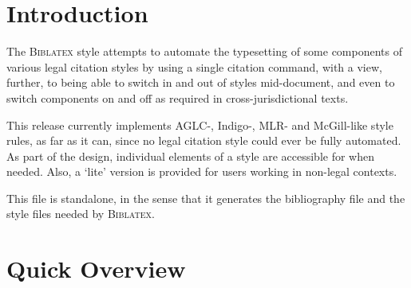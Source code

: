 \begin{center}
\end{center}

\section{Introduction}
\p The  \textsc{Biblatex} style attempts to automate the typesetting of some components of various legal citation styles by using a single citation command, with a view, further, to being able to switch in and out of styles mid-document, and even to switch components on and off as required in cross-jurisdictional texts. 

\p This release currently implements AGLC-, Indigo-, MLR- and McGill-like style rules, as far as it can, since no legal citation style could ever be fully automated. As part of the design, individual elements of a style are accessible for when needed. Also, a `lite' version is provided for users working in non-legal contexts.

\p This file is standalone, in the sense that it generates the bibliography file and the style files needed by \textsc{Biblatex}.

\section{Quick Overview}
\bigskip
\ 

\medskip\noindent
{}

\newpage
\ 

\medskip\noindent
{}

\newpage
\ 

\medskip\noindent
{}

